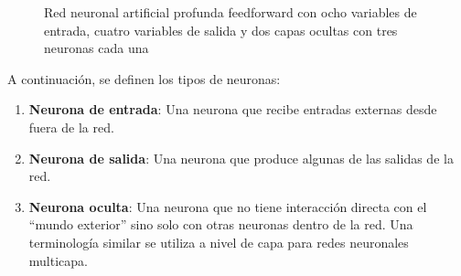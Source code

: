 \documentclass[
  us-letterpaper,
]{scrreprt}
\theoremstyle{plain}
\theoremstyle{definition}
\theoremstyle{plain}
\theoremstyle{definition}
\theoremstyle{remark}
\begin{document}
\begin{figure}


\caption{\label{fig-rnp}Red neuronal artificial profunda feedforward con
ocho variables de entrada, cuatro variables de salida y dos capas
ocultas con tres neuronas cada una}

\end{figure}%

A continuación, se definen los tipos de neuronas:

\begin{enumerate}
\def\labelenumi{\arabic{enumi}.}
\item
  \textbf{Neurona de entrada}: Una neurona que recibe entradas externas
  desde fuera de la red.
\item
  \textbf{Neurona de salida}: Una neurona que produce algunas de las
  salidas de la red.
\item
  \textbf{Neurona oculta}: Una neurona que no tiene interacción directa
  con el ``mundo exterior'' sino solo con otras neuronas dentro de la
  red. Una terminología similar se utiliza a nivel de capa para redes
  neuronales multicapa.
\end{enumerate}
\end{document}
